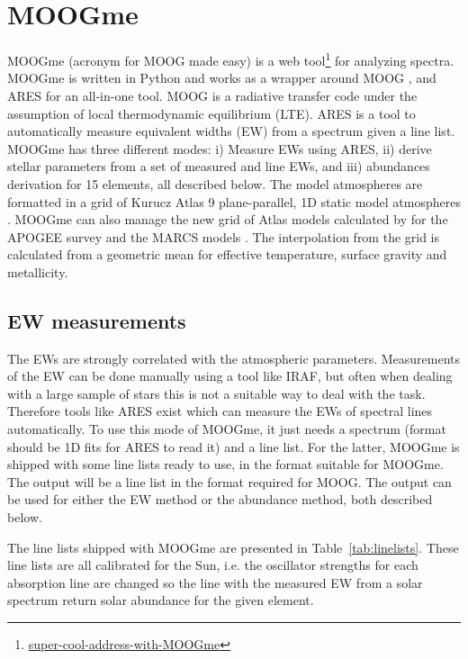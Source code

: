\documentclass{aa}
\begin{document}
\section{MOOGme}
\label{sec:MOOGme}
MOOGme (acronym for MOOG made easy) is a web
tool\footnote{\url{super-cool-address-with-MOOGme}} for analyzing spectra.
MOOGme is written in Python and works as a wrapper around MOOG
\citep[][version 2014]{Sneden1973}, and ARES \citep{Sousa2015a} for an all-in-one
tool. MOOG is a radiative transfer code under the assumption of local
thermodynamic equilibrium (LTE). ARES is a tool to automatically measure
equivalent widths (EW) from a spectrum given a line list. MOOGme has three
different modes: i) Measure EWs using ARES, ii) derive stellar parameters from a
set of measured  and  line EWs, and iii) abundances
derivation for 15 elements, all described below. The model atmospheres are
formatted in a grid of Kurucz Atlas 9 plane-parallel, 1D static model
atmospheres \citet{Kurucz1993}. MOOGme can also manage the new grid of Atlas
models calculated by \citet{Meszaros2012} for the APOGEE survey and the MARCS
models \citep{Gustafson2008}. The interpolation from the grid is calculated from
a geometric mean for effective temperature, surface gravity and metallicity.



\subsection{EW measurements}
\label{sub:EW_measurements}
The EWs are strongly correlated with the atmospheric parameters. Measurements of
the EW can be done manually using a tool like IRAF, but often when dealing with
a large sample of stars this is not a suitable way to deal with the task.
Therefore tools like ARES exist which can measure the EWs of spectral lines
automatically. To use this mode of MOOGme, it just needs a spectrum (format
should be 1D fits for ARES to read it) and a line list. For the latter, MOOGme
is shipped with some line lists ready to use, in the format suitable for MOOGme.
The output will be a line list in the format required for MOOG. The output can
be used for either the EW method or the abundance method, both described below.

The line lists shipped with MOOGme are presented in Table~\ref{tab:linelists}.
These line lists are all calibrated for the Sun, i.e. the oscillator strengths
for each absorption line are changed so the line with the measured EW from a
solar spectrum return solar abundance for the given element.
\end{document}
